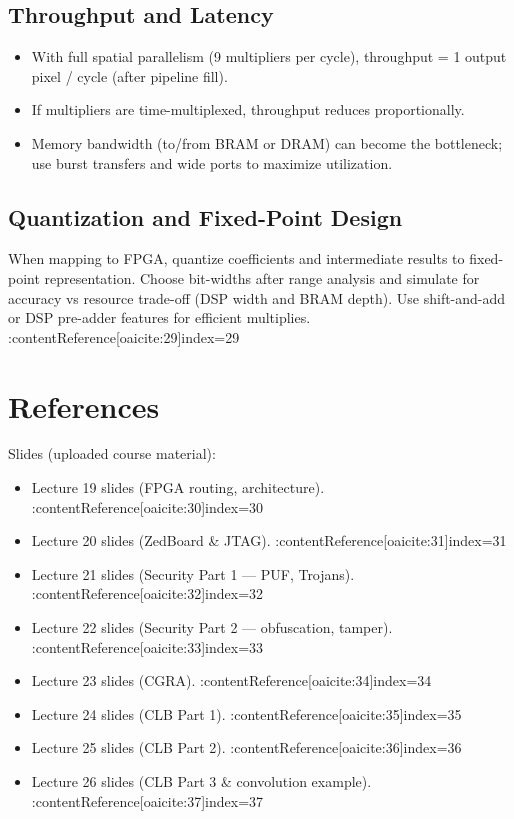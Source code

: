 \documentclass[11pt]{article}
\begin{document}
\subsection{Throughput and Latency}
\begin{itemize}
  \item With full spatial parallelism (9 multipliers per cycle), throughput = 1 output pixel / cycle (after pipeline fill).
  \item If multipliers are time-multiplexed, throughput reduces proportionally.
  \item Memory bandwidth (to/from BRAM or DRAM) can become the bottleneck; use burst transfers and wide ports to maximize utilization.
\end{itemize}

\subsection{Quantization and Fixed-Point Design}
When mapping to FPGA, quantize coefficients and intermediate results to fixed-point representation. Choose bit-widths after range analysis and simulate for accuracy vs resource trade-off (DSP width and BRAM depth). Use shift-and-add or DSP pre-adder features for efficient multiplies. :contentReference[oaicite:29]{index=29}

\newpage

\section{References}

Slides (uploaded course material):
\begin{itemize}
  \item Lecture 19 slides (FPGA routing, architecture). :contentReference[oaicite:30]{index=30}
  \item Lecture 20 slides (ZedBoard \& JTAG). :contentReference[oaicite:31]{index=31}
  \item Lecture 21 slides (Security Part 1 — PUF, Trojans). :contentReference[oaicite:32]{index=32}
  \item Lecture 22 slides (Security Part 2 — obfuscation, tamper). :contentReference[oaicite:33]{index=33}
  \item Lecture 23 slides (CGRA). :contentReference[oaicite:34]{index=34}
  \item Lecture 24 slides (CLB Part 1). :contentReference[oaicite:35]{index=35}
  \item Lecture 25 slides (CLB Part 2). :contentReference[oaicite:36]{index=36}
  \item Lecture 26 slides (CLB Part 3 \& convolution example). :contentReference[oaicite:37]{index=37}
\end{itemize}
\end{document}
